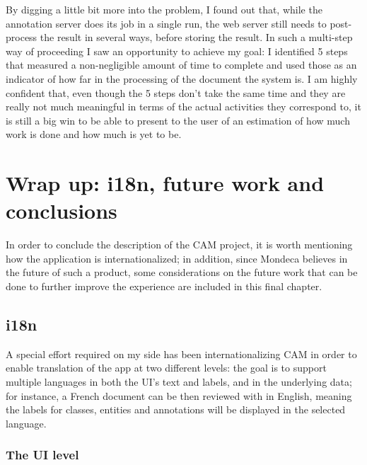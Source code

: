 \documentclass[12pt,svgnames]{memoir}
\begin{document}
By digging a little bit more into the problem, I found out that, while
the annotation server does its job in a single run, the web server still
needs to post-process the result in several ways, before storing the
result. In such a multi-step way of proceeding I saw an opportunity to
achieve my goal: I identified 5 steps that measured a non-negligible
amount of time to complete and used those as an indicator of how far in
the processing of the document the system is. I am highly confident
that, even though the 5 steps don't take the same time and they are
really not much meaningful in terms of the actual activities they
correspond to, it is still a big win to be able to present to the user
of an estimation of how much work is done and how much is yet to be.

\chapter{Wrap up: i18n, future work and
conclusions}\label{wrap-up-i18n-future-work-and-conclusions}

In order to conclude the description of the CAM project, it is worth
mentioning how the application is internationalized; in addition, since
Mondeca believes in the future of such a product, some considerations on
the future work that can be done to further improve the experience are
included in this final chapter.

\section{i18n}\label{i18n}

A special effort required on my side has been internationalizing CAM in
order to enable translation of the app at two different levels: the goal
is to support multiple languages in both the UI's text and labels, and
in the underlying data; for instance, a French document can be then
reviewed with in English, meaning the labels for classes, entities and
annotations will be displayed in the selected language.

\subsection{The UI level}\label{the-ui-level}
\end{document}
